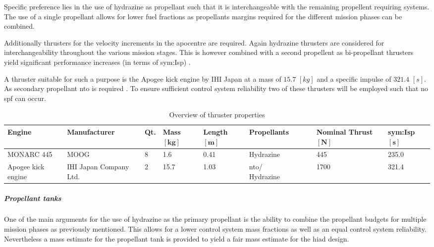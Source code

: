 Specific preference lies in the use of hydrazine as propellant such that it is interchangeable with the remaining propellent requiring systems. The use of a single propellant allows for lower fuel fractions as propellants margins required for the different mission phases can be combined.

Additionally thrusters for the velocity increments in the apocentre are required. Again hydrazine thrusters are considered for interchangeability throughout the various mission stages. This is however combined with a second propellent as bi-propellant thrusters yield significant performance increases (in terms of \gls{sym:Isp}) \cite{Wertz2011}. 

A thruster suitable for such a purpose is the Apogee kick engine by IHI Japan at a mass of $15.7$ $[kg]$ and a specific impulse of $321.4$ $[s]$. As secondary propellant \gls{nto} is required \cite[p.538]{Wertz2011}. To ensure sufficient control system reliability two of these thrusters will be employed such that no \gls{spf} can occur.  %


\begin{table}[h]
	\centering
\caption[Overview of thruster properties]{Overview of thruster properties \cite[p.538]{Wertz2011}}
\label{tab:thrusters}
\hspace{-5mm}
\begin{tabular}{|p{}|p{}|p{}|p{}|p{}|p{}|p{}|l|} \hline 
\textbf{Engine    }          &\textbf{ Manufacturer }         & \textbf{Qt.} &\textbf{Mass $\mathbf{[kg]}$}      & \textbf{Length $\mathbf{[m]}$} & \textbf{Propellants}  & \textbf{Nominal Thrust $\mathbf{[N]}$} & \textbf{\gls{sym:Isp} $\mathbf{[s]}$} \\ \hline \hline
MONARC 445          & MOOG                  & 8        & 1.6  & 0.41 & Hydrazine     & 445         & 235.0    \\ \hline
Apogee kick engine & IHI Japan Company Ltd. & 2        & 15.7 & 1.03 & \gls{nto}/ ~~~~~ Hydrazine & 1700        & 321.4    \\ \hline
\end{tabular}
\end{table}


\subparagraph{Propellant tanks}
One of the main arguments for the use of hydrazine as the primary propellant is the ability to combine the propellant budgets for multiple mission phases as previously mentioned. This allows for a lower control system mass fractions as well as an equal control system reliability. Nevertheless a mass estimate for the propellant tank is provided to yield a fair mass estimate for the \gls{hiad} design. 

